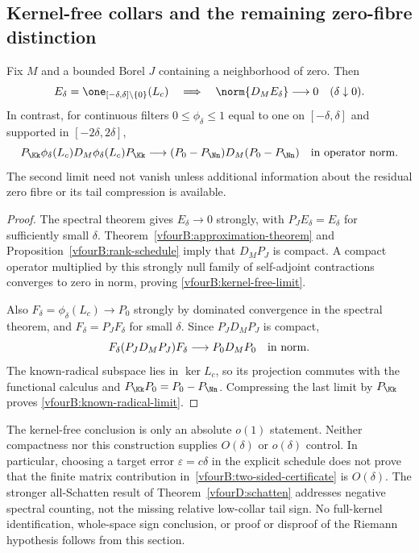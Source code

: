 \subsection{Kernel-free collars and the remaining zero-fibre distinction}
\label{vfourB:collars}

\begin{proposition}
\label{vfourB:collar-limits}
Fix $M$ and a bounded Borel $J$ containing a neighborhood of zero. Then
\begin{equation}\label{vfourB:kernel-free-limit}
 E_\delta=\one_{[-\delta,\delta]\setminus\{0\}}(L_c)
 \quad\Longrightarrow\quad
 \norm{D_ME_\delta}\longrightarrow0
 \quad(\delta\downarrow0).
\end{equation}
In contrast, for continuous filters $0\le\phi_\delta\le1$ equal to one
on $[-\delta,\delta]$ and supported in $[-2\delta,2\delta]$,
\begin{equation}\label{vfourB:known-radical-limit}
 P_\Kk\phi_\delta(L_c)D_M\phi_\delta(L_c)P_\Kk
 \longrightarrow (P_0-P_\Nn)D_M(P_0-P_\Nn)
 \quad\hbox{in operator norm}.
\end{equation}
The second limit need not vanish unless additional information about
the residual zero fibre or its tail compression is available.
\end{proposition}
\begin{proof}
The spectral theorem gives $E_\delta\to0$ strongly, with
$P_JE_\delta=E_\delta$ for sufficiently small $\delta$.
Theorem~\ref{vfourB:approximation-theorem} and
Proposition~\ref{vfourB:rank-schedule} imply that $D_MP_J$ is compact.
A compact operator multiplied by this strongly null family of
self-adjoint contractions converges to zero in norm, proving
\eqref{vfourB:kernel-free-limit}.

Also $F_\delta=\phi_\delta(L_c)\to P_0$ strongly by dominated convergence
in the spectral theorem, and $F_\delta=P_JF_\delta$ for small $\delta$.
Since $P_JD_MP_J$ is compact,
\[
 F_\delta(P_JD_MP_J)F_\delta\longrightarrow P_0D_MP_0
 \quad\hbox{in norm}.
\]
The known-radical subspace lies in $\ker L_c$, so its projection commutes
with the functional calculus and $P_\Kk P_0=P_0-P_\Nn$.
Compressing the last limit by $P_\Kk$ proves
\eqref{vfourB:known-radical-limit}.
\end{proof}

The kernel-free conclusion is only an absolute $o(1)$ statement.
Neither compactness nor this construction supplies $O(\delta)$ or
$o(\delta)$ control. In particular, choosing a target error
$\varepsilon=c\delta$ in the explicit schedule does not prove that the
finite matrix contribution in~\eqref{vfourB:two-sided-certificate} is
$O(\delta)$. The stronger all-Schatten result of
Theorem~\ref{vfourD:schatten} addresses negative spectral counting, not
the missing relative low-collar tail sign. No full-kernel identification,
whole-space sign conclusion, or proof or disproof of the Riemann
hypothesis follows from this section.
